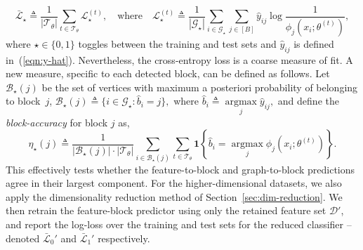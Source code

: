 %
\begin{equation}
	\bar{\mathcal{L}}_\star \triangleq \frac{1}{|\mathcal{T}_\theta|} \sum_{t \in \mathcal{T}_\theta} \mathcal{L}_\star^{(t)},
	\quad \textrm{where} \quad
	\mathcal{L}_\star^{(t)} \triangleq \frac{1}{|\mathcal{G}_\star|} \sum_{i \in \mathcal{G}_\star}\sum_{j \in [B]} \hat{y}_{ij} \log \frac{1}{\phi_j \left(x_i; \theta^{(t)} \right)},
	\label{eqn:cross-entropy-loss}
\end{equation}
%
where $\star \in \{0, 1\}$ toggles between the training and test sets
and $\hat{y}_{ij}$ is defined in~(\ref{eqn:y-hat}).
%
Nevertheless, the cross-entropy loss is a coarse measure of fit. 
A new measure, specific to each detected block,
can be defined as follows. Let
$\mathcal{B}_\star(j)$ 
be the set of vertices with maximum a posteriori probability of belonging 
to block~$j$,
$
	\mathcal{B}_\star(j) \triangleq \{i \in \mathcal{G}_\star : \hat{b}_i = j\},
$
where
$ 
	\hat{b}_i \triangleq \underset{j}{\operatorname{argmax}}\hat{y}_{ij},
$
and
define the {\em block-accuracy} for block $j$ as,
%
\begin{equation}
	\eta_\star(j) \triangleq \frac{1}{|\mathcal{B}_\star (j)| \cdot 
	|\mathcal{T}_\theta| } 
	\sum_{i \in \mathcal{B}_\star (j)}  \sum_{t \in \mathcal{T}_\theta}
	\boldsymbol{1} \left\{\hat{b}_i = \underset{j}{\operatorname{argmax}}\phi_j \left( x_i; \theta^{(t)} \right) \right\}.
	\label{eqn:accuracy}
\end{equation}
%
This effectively tests whether the feature-to-block and 
graph-to-block predictions agree in their largest component.
For the higher-dimensional datasets, we also apply the 
dimensionality reduction method 
of Section~\ref{sec:dim-reduction}.  
We then retrain the feature-block predictor using only the retained 
feature set $\mathcal{D}'$, and report the log-loss over the training and 
test sets for the reduced classifier -- 
denoted $\bar{\mathcal{L}}_0'$ and $\bar{\mathcal{L}}_1'$ respectively. 

